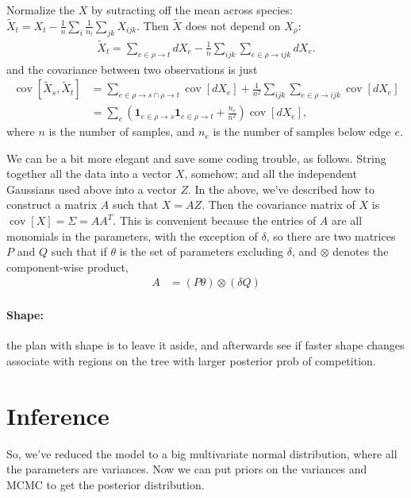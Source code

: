 \documentclass{article}
\DeclareMathOperator{\cov}{cov}
\begin{document}
Normalize the $X$ by sutracting off the mean across species: 
$\tilde X_t = X_t - \frac{1}{n}\sum_i \frac{1}{n_i} \sum_{jk} X_{ijk}$.
Then $\tilde X$ does not depend on $X_\rho$:
\begin{align}
    \tilde X_t = \sum_{e \in \rho \to t} dX_e - \frac{1}{n}\sum_{ijk} \sum_{e \in \rho \to ijk} dX_e .
\end{align}
and the covariance between two observations is just
\begin{align}
    \cov[\tilde X_s,\tilde X_t] &= \sum_{e \in \rho \to s \cap \rho \to t} \cov[dX_e] +  \frac{1}{n^2} \sum_{ijk} \sum_{e \in \rho \to ijk} \cov[ dX_e ] \\
    &= \sum_e \left( \mathbf{1}_{e \in \rho \to s} \mathbf{1}_{e \in \rho \to t} + \frac{n_e}{n^2} \right) \cov[dX_e] ,
\end{align}
where $n$ is the number of samples, and $n_e$ is the number of samples below edge $e$.


We can be a bit more elegant and save some coding trouble, as follows.
String together all the data into a vector $X$, somehow; 
and all the independent Gaussians used above into a vector $Z$.
In the above, we've described how to construct a matrix $A$ such that $X = AZ$.
Then the covariance matrix of $X$ is $\cov[X] = \Sigma = A A^T$.
This is convenient because the entries of $A$ are all monomials in the parameters, 
with the exception of $\delta$, so there are two matrices $P$ and $Q$ such that
if $\theta$ is the set of parameters excluding $\delta$, 
and $\otimes$ denotes the component-wise product,
\begin{align}
    A &= ( P \theta ) \otimes ( \delta Q ) 
\end{align}


\paragraph{Shape:} the plan with shape is to leave it aside, 
and afterwards see if faster shape changes associate with regions on the tree with larger posterior prob of competition.


\section{Inference}

So, we've reduced the model to a big multivariate normal distribution,
where all the parameters are variances.
Now we can put priors on the variances and MCMC to get the posterior distribution.
\end{document}
